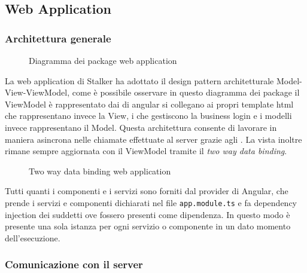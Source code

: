 \documentclass[../../manuale-manutentore.tex]{subfiles}
\begin{document}
\subsection{Web Application}%
\label{sub:architettura/web-app}

\subsubsection{Architettura generale}%
\label{subs:architettura_generale}

\begin{figure}[H]
  \centering
  \caption{Diagramma dei package web application}%
  \label{fig:web-app-package-diagram}
\end{figure}

La web application di Stalker ha adottato il design pattern architetturale Model-View-ViewModel, come è possibile osservare in questo diagramma dei package il ViewModel è rappresentato dai  di angular si collegano ai propri template html che rappresentano invece la View, i  che gestiscono la business login e i modelli invece rappresentano il Model.
Questa architettura consente di lavorare in maniera asincrona nelle chiamate effettuate al server grazie agli .
La vista inoltre rimane sempre aggiornata con il ViewModel tramite il \textit{two way data binding}.
\begin{figure}[H]
  \centering
  \caption{Two way data binding web application}%
  \label{fig:web-app-databinding}
\end{figure}

Tutti quanti i componenti e i servizi sono forniti dal provider di Angular, che prende i servizi e componenti dichiarati nel file \texttt{app.module.ts} e fa dependency injection dei suddetti ove fossero presenti come dipendenza.
In questo modo è presente una sola istanza per ogni servizio o componente in un dato momento dell'esecuzione.


\subsubsection{Comunicazione con il server}%
\label{subs:comunicazione_server}
\end{document}
